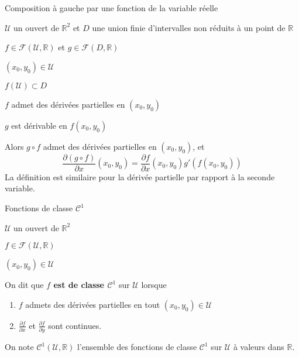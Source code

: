     \begin{prop}{Composition à gauche par une fonction de la variable réelle}{}
        \begin{soient}
            \item $\mathcal{U}$ un ouvert de $\mathbb{R}^2$ et $D$ une union finie d’intervalles non réduits à un point de $\mathbb{R}$
            \item $f\in \mathcal{F}(\mathcal{U},\mathbb{R})$ et $ g \in \mathcal{F}(D,\mathbb{R})$
            \item $(x_0,y_0) \in \mathcal{U}$
        \end{soient}
        \begin{suppose}
            \item $f(\mathcal{U}) \subset D$
            \item $f$ admet des dérivées partielles en $(x_0,y_0)$
            \item $g$ est dérivable en $f(x_0,y_0)$
        \end{suppose}
        Alors $g \circ f$ admet des dérivées partielles en $(x_0,y_0)$, et 
        \[ \frac{\partial (g \circ f)}{\partial x}(x_0,y_0) = \frac{\partial f}{\partial x}(x_0,y_0) g'(f(x_0,y_0)) \] 
        La définition est similaire pour la dérivée partielle par rapport à la seconde variable.
    \end{prop}

    \begin{defi}{Fonctions de classe $\mathcal{C}^1$}{}
        \begin{soient}
            \item $\mathcal{U}$ un ouvert de $\mathbb{R}^2$
            \item $f\in \mathcal{F}(\mathcal{U},\mathbb{R})$
            \item $(x_0,y_0) \in \mathcal{U}$
        \end{soient}
        On dit que \textbf{$f$ est de classe $\mathcal{C}^1$} sur $\mathcal{U}$ lorsque 
        \begin{enumerate}
            \item $f$ admets des dérivées partielles en tout $(x_0,y_0) \in \mathcal{U}$
            \item $\frac{\partial f}{\partial x}$ et $\frac{\partial f}{\partial y}$ sont continues.
        \end{enumerate}
        On note $\mathcal{C}^1(\mathcal{U},\mathbb{R})$ l’ensemble des fonctions de classe $\mathcal{C}^1$ sur $\mathcal{U}$ à valeurs dans $\mathbb{R}$.
    \end{defi}

